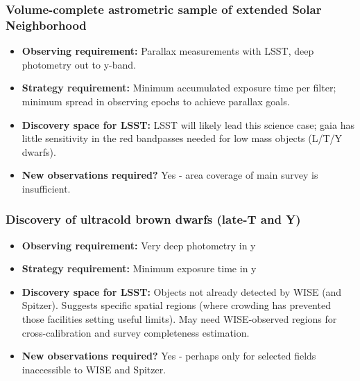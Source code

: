 \subsubsection{Volume-complete astrometric sample of extended Solar Neighborhood}
\vspace{-2mm}
\begin{itemize}

\item {\bf Observing requirement:} Parallax measurements with LSST, deep photometry out to y-band.
\vspace{-2mm}

\item {\bf Strategy requirement:} Minimum accumulated exposure time per filter; minimum spread in observing epochs to achieve parallax goals.
\vspace{-2mm}

\item {\bf Discovery space for LSST:} LSST will likely lead this science case; gaia has little sensitivity in the red bandpasses needed for low mass objects (L/T/Y dwarfs).
\vspace{-2mm}

\item {\bf New observations required?} Yes - area coverage of main survey is insufficient.
\vspace{-2mm}
\end{itemize}


\subsubsection{Discovery of ultracold brown dwarfs (late-T and Y)}
\vspace{-2mm}
\begin{itemize}
\item {\bf Observing requirement:} Very deep photometry in y \vspace{-2mm}
\item {\bf Strategy requirement:} Minimum exposure time in y \vspace{-2mm}
\item {\bf Discovery space for LSST:} Objects not already detected by WISE (and Spitzer). Suggests specific spatial regions (where crowding has prevented those facilities setting useful limits). May need WISE-observed regions for cross-calibration and survey completeness estimation. \vspace{-2mm}
\item {\bf New observations required?} Yes - perhaps only for selected fields inaccessible to WISE and Spitzer.
\end{itemize}


